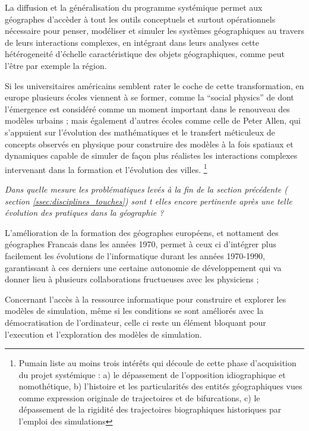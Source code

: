 La diffusion et la généralisation du programme systémique permet aux géographes d'accèder à tout les outils conceptuels et surtout opérationnels \autocite{Forrester1969} nécessaire pour penser, modéliser et simuler les systèmes géographiques au travers de leurs interactions complexes, en intégrant dans leurs analyses cette hétérogeneité d'échelle caractéristique des objets géographiques, comme peut l'être par exemple la région.

Si les universitaires américains semblent rater le coche de cette transformation, en europe plusieurs écoles viennent à se former, comme la \foreignquote{english}{social physics} de \autocite{Wilson1970} dont l'émergence est considéré comme un moment important dans le renouveau des modèles urbains \autocite{Griffith2010}; mais également d'autres écoles comme celle de Peter Allen, qui s'appuient sur l'évolution des mathématiques et le transfert méticuleux de concepts observés en physique pour construire des modèles à la fois spatiaux et dynamiques capable de simuler de façon plus réalistes les interactions complexes intervenant dans la formation et l'évolution des villes. \autocite[11]{Batty1976, Batty2001} \autocite[27-28]{Pumain2003} \footnote{ Pumain liste au moins trois intérêts qui découle de cette phase d'acquisition du projet systémique : a) le dépassement de l'opposition idiographique et nomothétique, b) l'histoire et les particularités des entités géographiques vues comme expression originale de trajectoires et de bifurcations, c) le dépassement de la rigidité des trajectoires biographiques historiques par l'emploi des simulations}

\textit{Dans quelle mesure les problématiques levés à la fin de la section précédente ( section \ref{ssec:disciplines_touches}) sont t elles encore pertinente après une telle évolution des pratiques dans la géographie ? }

L'amélioration de la formation des géographes européens, et nottament des géographes Francais dans les années 1970, permet à ceux ci d'intégrer plus facilement les évolutions de l'informatique durant les années 1970-1990, garantissant à ces derniers une certaine autonomie de développement qui va donner lieu à plusieurs collaborations fructueuses avec les physiciens \autocite{Pumain1984}; 

Concernant l'accès à la ressource informatique pour construire et explorer les modèles de simulation, même si les conditions se sont améliorés avec la démocratisation de l'ordinateur, celle ci reste un élément bloquant pour l'execution et l'exploration des modèles de simulation.

